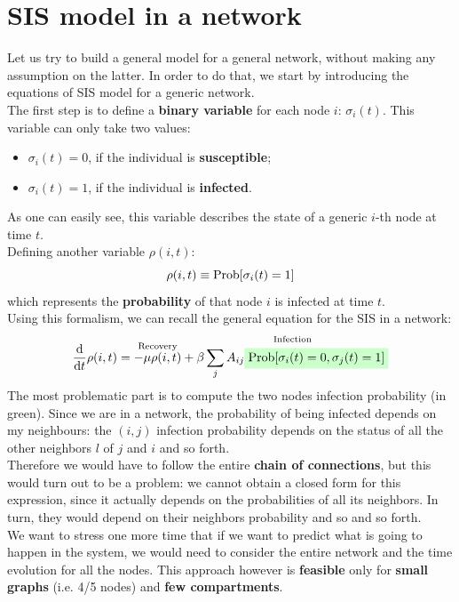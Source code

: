 \documentclass[../main/main.tex]{subfiles}
\begin{document}
\section{SIS model in a network}
Let us try to build a general model for a general network, without making any assumption on the latter. In order to do that, we start by introducing the equations of SIS model for a generic network.\\
The first step is to define a \textbf{binary variable} for each node \( i \): \( \sigma _i (t) \). This variable can only take two values:
\begin{itemize}
\item \( \sigma _i (t) = 0 \), if the individual is \textbf{susceptible};
\item \( \sigma _i (t) = 1 \), if the individual is \textbf{infected}.
\end{itemize}
As one can easily see, this variable describes the state of a generic $i$-th node at time $t$.\\
Defining another variable \( \rho (i,t) \):
\begin{equation*}
  \rho (i,t) \equiv \text{Prob} \qty[\sigma _i (t) = 1]
\end{equation*}
which represents the \textbf{probability} of that node \( i \) is infected at time \( t \).\\
Using this formalism, we can recall the general equation for the SIS in a network:
\begin{equation}
  \dv{}{t} \rho (i,t) = \overset{\text{Recovery}}{- \mu  \rho (i,t)} + \overset{\text{Infection}}{\beta \sum_{j}^{} A_{ij} \mathcolorbox{green!20}{\text{Prob} [\sigma _i (t) = 0, \sigma _j (t ) =1 ]   }}
\end{equation}
The most problematic part is to compute the two nodes infection probability (in green). Since we are in a network, the probability of being infected depends on my neighbours: the \( (i,j) \) infection probability depends on the status of all the other neighbors \( l \) of \( j \) and \( i \) and so forth.\\
Therefore we would have to follow the entire \textbf{chain of connections}, but this would turn out to be a problem: we cannot obtain a closed form for this expression, since it actually depends on the probabilities of all its neighbors. In turn, they would depend on their neighbors probability and so and so forth.\\
We want to stress one more time that if we want to predict what is going to happen in the system, we would need to consider the entire network and the time evolution for all the nodes. This approach however is \textbf{feasible} only for \textbf{small graphs} (i.e. 4/5 nodes) and \textbf{few compartments}.\\
\end{document}
